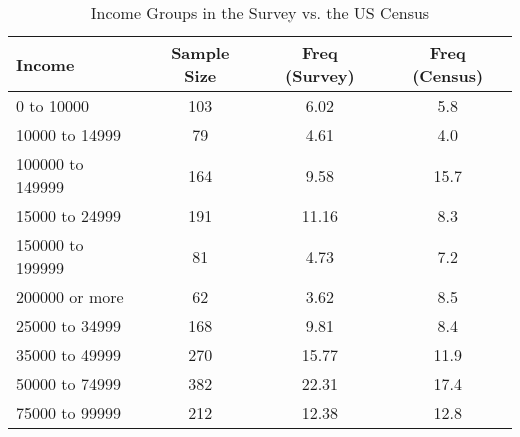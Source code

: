 \begin{table}[th!]
\centering
\caption{Income Groups in the Survey vs. the US Census}
\label{tab-05-census-inc.tex}
\begin{tabular}{lccc}
\toprule
          Income &  Sample Size &  Freq (Survey) &  Freq (Census) \\
\midrule
      0 to 10000 &          103 &           6.02 &            5.8 \\
  10000 to 14999 &           79 &           4.61 &            4.0 \\
100000 to 149999 &          164 &           9.58 &           15.7 \\
  15000 to 24999 &          191 &          11.16 &            8.3 \\
150000 to 199999 &           81 &           4.73 &            7.2 \\
  200000 or more &           62 &           3.62 &            8.5 \\
  25000 to 34999 &          168 &           9.81 &            8.4 \\
  35000 to 49999 &          270 &          15.77 &           11.9 \\
  50000 to 74999 &          382 &          22.31 &           17.4 \\
  75000 to 99999 &          212 &          12.38 &           12.8 \\
\bottomrule
\end{tabular}
\end{table}
